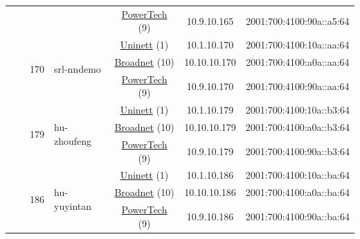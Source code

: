 \begin{small}
\begin{center}
\begin{longtable}{|c|c|c|c|c|c|c|c|}
  &  &  &  & \multicolumn{2}{|c|}{\tiny{\href{http://www.powertech.no}{PowerTech} (9)}} & \tiny{10.9.10.165} & \tiny{2001:700:4100:90a::a5:64} \\* \cline{3-3}\cline{4-4}\cline{5-5}\cline{6-6}\cline{7-7}\cline{8-8}
  &  & \multirow{3}{*}{\tiny{170}} & \multicolumn{1}{|l|}{\multirow{3}{*}{\tiny{srl-nndemo}}} & \multicolumn{2}{|c|}{\tiny{\href{https://www.uninett.no}{Uninett} (1)}} & \tiny{10.1.10.170} & \tiny{2001:700:4100:10a::aa:64} \\* \cline{5-5}\cline{6-6}\cline{7-7}\cline{8-8}
  &  &  &  & \multicolumn{2}{|c|}{\tiny{\href{https://www.broadnet.no}{Broadnet} (10)}} & \tiny{10.10.10.170} & \tiny{2001:700:4100:a0a::aa:64} \\* \cline{5-5}\cline{6-6}\cline{7-7}\cline{8-8}
  &  &  &  & \multicolumn{2}{|c|}{\tiny{\href{http://www.powertech.no}{PowerTech} (9)}} & \tiny{10.9.10.170} & \tiny{2001:700:4100:90a::aa:64} \\* \cline{3-3}\cline{4-4}\cline{5-5}\cline{6-6}\cline{7-7}\cline{8-8}
  &  & \multirow{3}{*}{\tiny{179}} & \multicolumn{1}{|l|}{\multirow{3}{*}{\tiny{hu-zhoufeng}}} & \multicolumn{2}{|c|}{\tiny{\href{https://www.uninett.no}{Uninett} (1)}} & \tiny{10.1.10.179} & \tiny{2001:700:4100:10a::b3:64} \\* \cline{5-5}\cline{6-6}\cline{7-7}\cline{8-8}
  &  &  &  & \multicolumn{2}{|c|}{\tiny{\href{https://www.broadnet.no}{Broadnet} (10)}} & \tiny{10.10.10.179} & \tiny{2001:700:4100:a0a::b3:64} \\* \cline{5-5}\cline{6-6}\cline{7-7}\cline{8-8}
  &  &  &  & \multicolumn{2}{|c|}{\tiny{\href{http://www.powertech.no}{PowerTech} (9)}} & \tiny{10.9.10.179} & \tiny{2001:700:4100:90a::b3:64} \\* \cline{3-3}\cline{4-4}\cline{5-5}\cline{6-6}\cline{7-7}\cline{8-8}
  &  & \multirow{3}{*}{\tiny{186}} & \multicolumn{1}{|l|}{\multirow{3}{*}{\tiny{hu-yuyintan}}} & \multicolumn{2}{|c|}{\tiny{\href{https://www.uninett.no}{Uninett} (1)}} & \tiny{10.1.10.186} & \tiny{2001:700:4100:10a::ba:64} \\* \cline{5-5}\cline{6-6}\cline{7-7}\cline{8-8}
  &  &  &  & \multicolumn{2}{|c|}{\tiny{\href{https://www.broadnet.no}{Broadnet} (10)}} & \tiny{10.10.10.186} & \tiny{2001:700:4100:a0a::ba:64} \\* \cline{5-5}\cline{6-6}\cline{7-7}\cline{8-8}
  &  &  &  & \multicolumn{2}{|c|}{\tiny{\href{http://www.powertech.no}{PowerTech} (9)}} & \tiny{10.9.10.186} & \tiny{2001:700:4100:90a::ba:64} \\* \cline{3-3}\cline{4-4}\cline{5-5}\cline{6-6}\cline{7-7}\cline{8-8}

\end{longtable}
\end{center}
\end{small}
